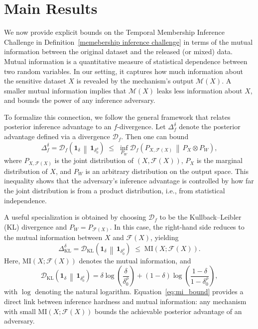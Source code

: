 \documentclass[sigconf,anonymous, review]{acmart}
\begin{document}
\section{Main Results}
We now provide explicit bounds on the Temporal Membership Inference Challenge in Definition~\ref{memebership inference challenge} in terms of the mutual information between the original dataset and the released (or mixed) data. Mutual information is a quantitative measure of statistical dependence between two random variables. In our setting, it captures how much information about the sensitive dataset $X$ is revealed by the mechanism's output $\mathcal{M}(X)$. A smaller mutual information implies that $\mathcal{M}(X)$ leaks less information about $X$, and bounds the power of any inference adversary.

To formalize this connection, we follow the general framework that relates posterior inference advantage to an $f$-divergence. Let $\Delta_f^\delta$ denote the posterior advantage defined via a divergence $\mathcal{D}_f$. Then one can bound
\begin{equation}\label{eq:general_f_bound}
\Delta_f^\delta
=
\mathcal{D}_f\!\left(
    \mathbf{1}_\delta \,\middle\|\, \mathbf{1}_{\delta_0^\rho}
\right)
\;\le\;
\inf_{P_W}
\mathcal{D}_f\!\left(
    P_{X,\mathcal{F}(X)}
    \,\middle\|\,
    P_X \otimes P_W
\right),
\end{equation}
where $P_{X,\mathcal{F}(X)}$ is the joint distribution of $(X,\mathcal{F}(X))$, $P_X$ is the marginal distribution of $X$, and $P_W$ is an arbitrary distribution on the output space. This inequality shows that the adversary's inference advantage is controlled by how far the joint distribution is from a product distribution, i.e., from statistical independence.

A useful specialization is obtained by choosing $\mathcal{D}_f$ to be the Kullback--Leibler (KL) divergence and $P_W = P_{\mathcal{F}(X)}$. In this case, the right-hand side reduces to the mutual information between $X$ and $\mathcal{F}(X)$, yielding
\begin{equation}\label{eq:mi_bound}
\Delta_{\mathrm{KL}}^\delta
=
\mathcal{D}_{\mathrm{KL}}\!\left(
    \mathbf{1}_\delta
    \,\middle\|\,
    \mathbf{1}_{\delta_0^\rho}
\right)
\;\le\;
\mathrm{MI}\!\left(X;\mathcal{F}(X)\right).
\end{equation}
Here, $\mathrm{MI}(X;\mathcal{F}(X))$ denotes the mutual information, and
\[
\mathcal{D}_{\mathrm{KL}}\!\left(
    \mathbf{1}_\delta
    \,\middle\|\,
    \mathbf{1}_{\delta_0^\rho}
\right)
=
\delta \log\!\left(\frac{\delta}{\delta_0^\rho}\right)
+
(1-\delta)\log\!\left(
    \frac{1-\delta}{1-\delta_0^\rho}
\right),
\]
with $\log$ denoting the natural logarithm. Equation~\eqref{eq:mi_bound} provides a direct link between inference hardness and mutual information: any mechanism with small $\mathrm{MI}(X;\mathcal{F}(X))$ bounds the achievable posterior advantage of an adversary.
\end{document}
